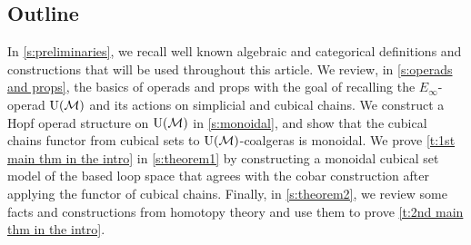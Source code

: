 \subsection*{Outline}

In \cref{s:preliminaries}, we recall well known algebraic and categorical definitions and constructions that will be used throughout this article.
We review, in \cref{s:operads and props}, the basics of operads and props with the goal of recalling the $E_{\infty}$-operad ${\operatorname{U}(\mathcal{M})}$ and its actions on simplicial and cubical chains.
We construct a Hopf operad structure on ${\operatorname{U}(\mathcal{M})}$ in \cref{s:monoidal}, and show that the cubical chains functor from cubical sets to ${\operatorname{U}(\mathcal{M})}$-coalgeras is monoidal.
We prove \cref{t:1st main thm in the intro} in \cref{s:theorem1} by constructing a monoidal cubical set model of the based loop space that agrees with the cobar construction after applying the functor of cubical chains.
Finally, in \cref{s:theorem2}, we review some facts and constructions from homotopy theory and use them to prove \cref{t:2nd main thm in the intro}.